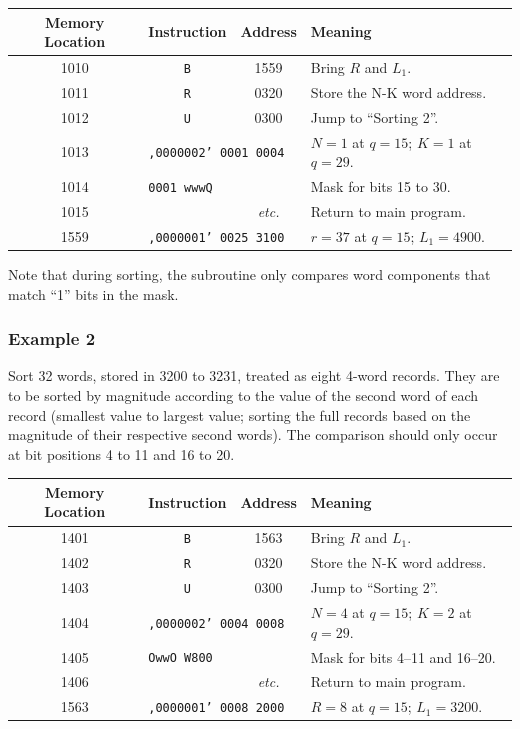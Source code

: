 \begin{table}[h!]
\centering
\begin{tabularx}{\textwidth}{cccX}
\toprule
\textbf{Memory Location} & \textbf{Instruction} & \textbf{Address} & \textbf{Meaning} \\
\midrule
1010 & \texttt{B} & 1559 & Bring $R$ and $L_1$. \\
1011 & \texttt{R} & 0320 & Store the N-K word address. \\
1012 & \texttt{U} & 0300 & Jump to ``Sorting 2''. \\
1013 & \multicolumn{2}{l}{\texttt{,0000002' 0001 0004}} & $N=1$ at $q=15$; $K=1$ at $q=29$. \\
1014 & \multicolumn{2}{l}{\texttt{0001 wwwQ}} & Mask for bits 15 to 30. \\
1015 &            & \textit{etc.} & Return to main program. \\
\midrule
1559 & \multicolumn{2}{l}{\texttt{,0000001' 0025 3100}} & $r=37$ at $q=15$; $L_1=4900$. \\
\bottomrule
\end{tabularx}
\end{table}

Note that during sorting, the subroutine only compares word components that match ``1'' bits in the mask.

\subsubsection*{Example 2}
Sort 32 words, stored in 3200 to 3231, treated as eight 4-word records. They are to be sorted by magnitude according to the value of the second word of each record (smallest value to largest value; sorting the full records based on the magnitude of their respective second words). The comparison should only occur at bit positions 4 to 11 and 16 to 20.

\begin{table}[h!]
\centering
\begin{tabularx}{\textwidth}{cccX}
\toprule
\textbf{Memory Location} & \textbf{Instruction} & \textbf{Address} & \textbf{Meaning} \\
\midrule
1401 & \texttt{B} & 1563 & Bring $R$ and $L_1$. \\
1402 & \texttt{R} & 0320 & Store the N-K word address. \\
1403 & \texttt{U} & 0300 & Jump to ``Sorting 2''. \\
1404 & \multicolumn{2}{l}{\texttt{,0000002' 0004 0008}} & $N=4$ at $q=15$; $K=2$ at $q=29$. \\
1405 & \multicolumn{2}{l}{\texttt{OwwO W800}} & Mask for bits 4--11 and 16--20. \\
1406 &            & \textit{etc.} & Return to main program. \\
\midrule
1563 & \multicolumn{2}{l}{\texttt{,0000001' 0008 2000}} & $R=8$ at $q=15$; $L_1=3200$. \\
\bottomrule
\end{tabularx}
\end{table}

